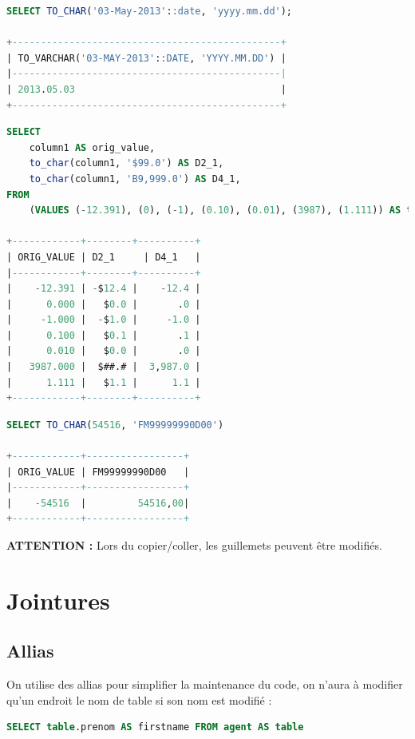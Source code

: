 \begin{lstlisting}[language=SQL]
SELECT TO_CHAR('03-May-2013'::date, 'yyyy.mm.dd');

+-----------------------------------------------+
| TO_VARCHAR('03-MAY-2013'::DATE, 'YYYY.MM.DD') |
|-----------------------------------------------|
| 2013.05.03                                    |
+-----------------------------------------------+
\end{lstlisting}

\begin{lstlisting}[language=SQL]
SELECT 
    column1 AS orig_value,
    to_char(column1, '$99.0') AS D2_1,
    to_char(column1, 'B9,999.0') AS D4_1,
FROM 
    (VALUES (-12.391), (0), (-1), (0.10), (0.01), (3987), (1.111)) AS t(column1);

+------------+--------+----------+
| ORIG_VALUE | D2_1     | D4_1   |
|------------+--------+----------+
|    -12.391 | -$12.4 |    -12.4 |
|      0.000 |   $0.0 |       .0 |
|     -1.000 |  -$1.0 |     -1.0 |
|      0.100 |   $0.1 |       .1 |
|      0.010 |   $0.0 |       .0 |
|   3987.000 |  $##.# |  3,987.0 |
|      1.111 |   $1.1 |      1.1 |
+------------+--------+----------+
\end{lstlisting}

\begin{lstlisting}[language = SQL]
SELECT TO_CHAR(54516, 'FM99999990D00')

+------------+-----------------+
| ORIG_VALUE | FM99999990D00   |
|------------+-----------------+
|    -54516  |         54516,00|
+------------+-----------------+
\end{lstlisting}

\textbf{ATTENTION :} Lors du copier/coller, les guillemets peuvent être modifiés.

\section{Jointures}

\subsection{Allias} \label{allias}
On utilise des allias pour simplifier la maintenance du code, on n'aura à modifier qu'un endroit le nom de table si son nom est modifié :
\begin{lstlisting}[language=SQL]
SELECT table.prenom AS firstname FROM agent AS table
\end{lstlisting}

